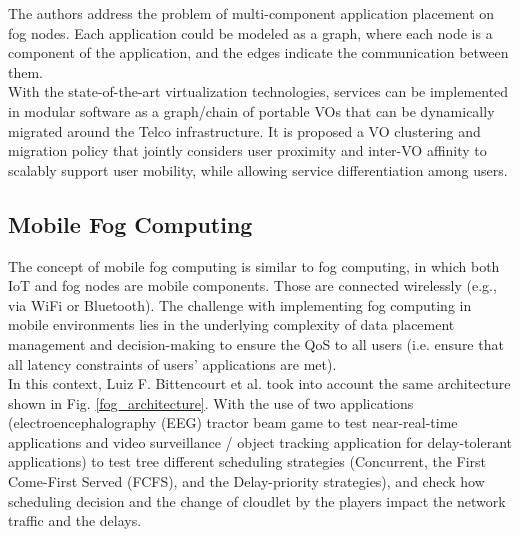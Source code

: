 \cite{bahreini2017efficient}
The authors address the problem of multi-component application placement on fog nodes. Each application could be modeled as a graph, where each node is a component of the application, and the edges indicate the communication between them.\\


\cite{bruschi2018move}
With the state-of-the-art virtualization technologies, services can be implemented in modular software as a graph/chain of portable VOs that can be dynamically migrated around the Telco infrastructure. It is proposed a VO clustering and migration policy that jointly considers user proximity and inter-VO affinity to scalably support user mobility, while allowing service differentiation among users.




 

\subsection{Mobile Fog Computing}
\label{sec:Mobility}
The concept of mobile fog computing is similar to fog computing, in which both IoT and fog nodes are mobile components. Those are connected wirelessly (e.g., via WiFi or Bluetooth). The challenge with implementing fog computing in mobile environments lies in the underlying complexity of data placement management and decision-making to ensure the QoS to all users (i.e. ensure that all latency constraints of users' applications are met).\\

In this context, Luiz F. Bittencourt et al. \cite{bittencourt2017mobility} took into account the same architecture shown in Fig. \ref{fog_architecture}. With the use of two applications (electroencephalography (EEG) tractor beam game to test near-real-time applications and video surveillance / object tracking application for delay-tolerant applications) to test tree different scheduling strategies (Concurrent, the First Come-First Served (FCFS), and the Delay-priority strategies), and check how scheduling decision and the change of cloudlet by the players impact the network traffic and the delays.\\

